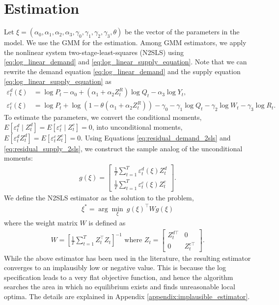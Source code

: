 \documentclass[11pt, a4paper]{article}
\theoremstyle{remark}
\begin{document}
\section{Estimation}
Let $\xi = (\alpha_0,\alpha_1, \alpha_2, \alpha_3, \gamma_0,\gamma_1, \gamma_2, \gamma_3, \theta)$ be the vector of the parameters in the model. 
We use the GMM for the estimation.
Among GMM estimators, we apply the nonlinear system two-stage-least-squares (N2SLS) using \eqref{eq:log_linear_demand} and \eqref{eq:log_linear_supply_equation}.
Note that we can rewrite the demand equation \eqref{eq:log_linear_demand} and the supply equation \eqref{eq:log_linear_supply_equation} as
\begin{align}
    {\varepsilon}_t^d(\xi) & =  \log P_{t} - \alpha_0 + (\alpha_1 + \alpha_2 Z^{R}_{t}) \log Q_t - \alpha_3 \log Y_t \label{eq:residual_demand_2sls}, \\
    {\varepsilon}_t^c(\xi) & =  \log P_t + \log(1 - \theta(\alpha_1 + \alpha_2 Z^{R}_{t})) -\gamma_0 - \gamma_1 \log Q_t -  \gamma_2 \log W_{t} -\gamma_3 \log R_t \label{eq:residual_supply_2sls}.
\end{align}
To estimate the parameters, we convert the conditional moments, $E[\varepsilon_t^d\mid Z_t^d] = E[\varepsilon_t^c\mid Z_t^c]=0$, into unconditional moments, $E[\varepsilon_t^d Z_t^d] = E[\varepsilon_t^cZ_t^c]=0$.
Using Equations \eqref{eq:residual_demand_2sls} and \eqref{eq:residual_supply_2sls}, we construct the sample analog of the unconditional moments:
\begin{align*}
    g(\xi) = \left[\begin{array}{l}
    \frac{1}{T}\sum_{t=1}^T{\varepsilon}^{d}_{t}(\xi)Z_{t}^{d} \\
    \frac{1}{T}\sum_{t=1}^T{\varepsilon}^{c}_{t}(\xi)Z_{t}^{c}
    \end{array}\right].
\end{align*}
We define the N2SLS estimator as the solution to the problem,
\begin{align}
     \xi^* = \arg \min_{\xi}\ g(\xi)^\top W g(\xi) \label{eq:minimization_gmm}
\end{align}
where the weight matrix $W$ is defined as
\begin{align}
    W = \left[\frac{1}{T}\sum_{t = 1}^T Z_t^\top Z_t\right]^{-1} \text{ where } Z_{t}=\left[\begin{array}{ll}
        Z_{t}^{d\top} & 0 \\
        0 & Z_{t}^{c\top}
    \end{array}\right].\label{eq:weight_matrix}
\end{align}
While the above estimator has been used in the literature, the resulting estimator converges to an implausibly low or negative value.
This is because the log specification leads to a very flat objective function, and hence the algorithm searches the area in which no equilibrium exists and finds unreasonable local optima.
The details are explained in Appendix \ref{appendix:implausible_estimator}.
\end{document}
